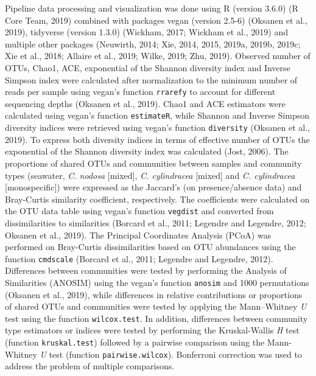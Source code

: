 \documentclass[
  12pt,
]{article}
\begin{document}
Pipeline data processing and visualization was done using R (version
3.6.0) (R Core Team, 2019) combined with packages vegan (version 2.5-6)
(Oksanen et al., 2019), tidyverse (version 1.3.0) (Wickham, 2017;
Wickham et al., 2019) and multiple other packages (Neuwirth, 2014; Xie,
2014, 2015, 2019a, 2019b, 2019c; Xie et al., 2018; Allaire et al., 2019;
Wilke, 2019; Zhu, 2019). Observed number of OTUs, Chao1, ACE,
exponential of the Shannon diversity index and Inverse Simpson index
were calculated after normalization to the minimum number of reads per
sample using vegan's function \texttt{rrarefy} to account for different
sequencing depths (Oksanen et al., 2019). Chao1 and ACE estimators were
calculated using vegan's function \texttt{estimateR}, while Shannon and
Inverse Simpson diversity indices were retrieved using vegan's function
\texttt{diversity} (Oksanen et al., 2019). To express both diversity
indices in terms of effective number of OTUs the exponential of the
Shannon diversity index was calculated (Jost, 2006). The proportions of
shared OTUs and communities between samples and community types
(seawater, \emph{C. nodosa} {[}mixed{]}, \emph{C. cylindracea}
{[}mixed{]} and \emph{C. cylindracea} {[}monospecific{]}) were expressed
as the Jaccard's (on presence/absence data) and Bray-Curtis similarity
coefficient, respectively. The coefficients were calculated on the OTU
data table using vegan's function \texttt{vegdist} and converted from
dissimilarities to similarities (Borcard et al., 2011; Legendre and
Legendre, 2012; Oksanen et al., 2019). The Principal Coordinates
Analysis (PCoA) was performed on Bray-Curtis dissimilarities based on
OTU abundances using the function \texttt{cmdscale} (Borcard et al.,
2011; Legendre and Legendre, 2012). Differences between communities were
tested by performing the Analysis of Similarities (ANOSIM) using the
vegan's function \texttt{anosim} and 1000 permutations (Oksanen et al.,
2019), while differences in relative contributions or proportions of
shared OTUs and communities were tested by applying the Mann--Whitney
\emph{U} test using the function \texttt{wilcox.test}. In addition,
differences between community type estimators or indices were tested by
performing the Kruskal-Wallis \emph{H} test (function
\texttt{kruskal.test}) followed by a pairwise comparison using the
Mann-Whitney \emph{U} test (function \texttt{pairwise.wilcox}).
Bonferroni correction was used to address the problem of multiple
comparisons.
\end{document}
